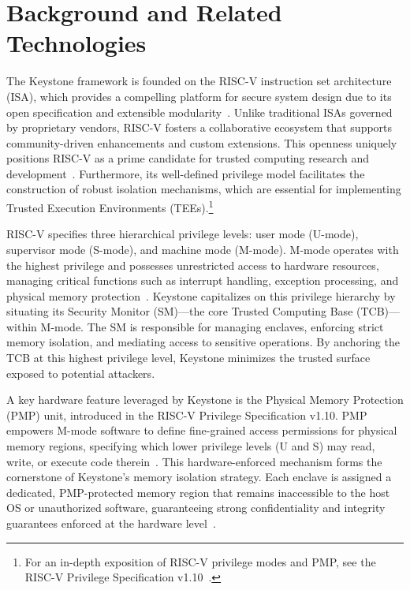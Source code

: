 \chapter{Background and Related Technologies}
\label{chap:background}

The Keystone framework is founded on the RISC-V instruction set architecture (ISA), which provides a compelling platform for secure system design due to its open specification and extensible modularity~\cite{Lee2019,Lee2019}. Unlike traditional ISAs governed by proprietary vendors, RISC-V fosters a collaborative ecosystem that supports community-driven enhancements and custom extensions. This openness uniquely positions RISC-V as a prime candidate for trusted computing research and development~\cite{Survey2023}. Furthermore, its well-defined privilege model facilitates the construction of robust isolation mechanisms, which are essential for implementing Trusted Execution Environments (TEEs).\footnote{For an in-depth exposition of RISC-V privilege modes and PMP, see the RISC-V Privilege Specification v1.10~\cite{keystone2025how}.}

RISC-V specifies three hierarchical privilege levels: user mode (U-mode), supervisor mode (S-mode), and machine mode (M-mode). M-mode operates with the highest privilege and possesses unrestricted access to hardware resources, managing critical functions such as interrupt handling, exception processing, and physical memory protection~\cite{Lee2019}. Keystone capitalizes on this privilege hierarchy by situating its Security Monitor (SM)—the core Trusted Computing Base (TCB)—within M-mode. The SM is responsible for managing enclaves, enforcing strict memory isolation, and mediating access to sensitive operations. By anchoring the TCB at this highest privilege level, Keystone minimizes the trusted surface exposed to potential attackers.

A key hardware feature leveraged by Keystone is the Physical Memory Protection (PMP) unit, introduced in the RISC-V Privilege Specification v1.10. PMP empowers M-mode software to define fine-grained access permissions for physical memory regions, specifying which lower privilege levels (U and S) may read, write, or execute code therein~\cite{keystone2025how}. This hardware-enforced mechanism forms the cornerstone of Keystone’s memory isolation strategy. Each enclave is assigned a dedicated, PMP-protected memory region that remains inaccessible to the host OS or unauthorized software, guaranteeing strong confidentiality and integrity guarantees enforced at the hardware level~\cite{Lee2019}.

